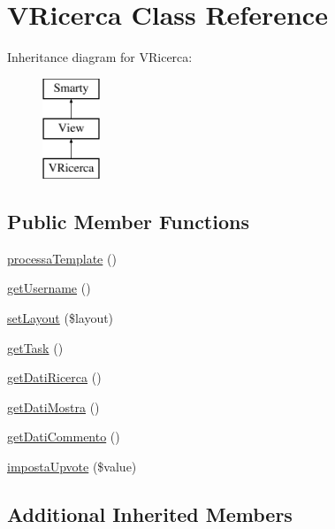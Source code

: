 \hypertarget{class_v_ricerca}{}\section{V\+Ricerca Class Reference}
\label{class_v_ricerca}
Inheritance diagram for V\+Ricerca\+:\begin{figure}[H]
\begin{center}
\leavevmode
\includegraphics[height=3.000000cm]{class_v_ricerca}
\end{center}
\end{figure}
\subsection*{Public Member Functions}
\begin{DoxyCompactItemize}
\item 
\mbox{\hyperlink{class_v_ricerca_a64bdc484fc7074989b4b2c0ebc63aec2}{processa\+Template}} ()
\item 
\mbox{\hyperlink{class_v_ricerca_a81b37a3c9d639574e394f80c1138c75e}{get\+Username}} ()
\item 
\mbox{\hyperlink{class_v_ricerca_a702b3376618a26e6c02c05bae65c6b9e}{set\+Layout}} (\$layout)
\item 
\mbox{\hyperlink{class_v_ricerca_a13871c4434338f02d6f8d430fa0597f2}{get\+Task}} ()
\item 
\mbox{\hyperlink{class_v_ricerca_a0867be22250ee77c1059627deb1333ef}{get\+Dati\+Ricerca}} ()
\item 
\mbox{\hyperlink{class_v_ricerca_a21c1b6e37828f68cadec73d5fe012eef}{get\+Dati\+Mostra}} ()
\item 
\mbox{\hyperlink{class_v_ricerca_abe042c7ec0bf0e26f8b6d97855ffe723}{get\+Dati\+Commento}} ()
\item 
\mbox{\hyperlink{class_v_ricerca_ab8847e349586a6d30c71143e8c96d14b}{imposta\+Upvote}} (\$value)
\end{DoxyCompactItemize}
\subsection*{Additional Inherited Members}


